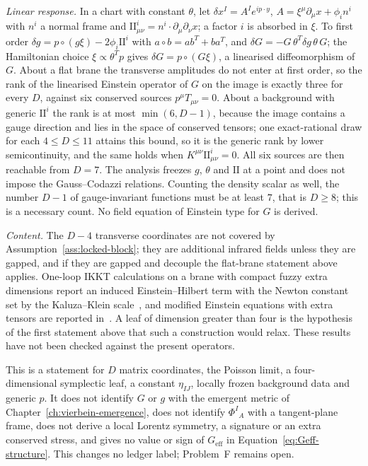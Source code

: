 \emph{Linear response.} In a chart with constant \(\theta\), let \(\delta x^{I}=A^{I}e^{ip\cdot y}\), \(A=\xi^{\mu}\partial_\mu x+\phi_i n^{i}\) with \(n^{i}\) a normal frame and \(\mathrm{II}^{i}_{\mu\nu}=n^{i}\cdot\partial_\mu\partial_\nu x\); a factor \(i\) is absorbed in \(\xi\). To first order \(\delta g=p\circ(g\xi)-2\phi_i\mathrm{II}^{i}\) with \(a\circ b=ab^{T}+ba^{T}\), and \(\delta G=-G\,\theta^{T}\delta g\,\theta\,G\); the Hamiltonian choice \(\xi\propto\theta^{T}p\) gives \(\delta G=p\circ(G\xi)\), a linearised diffeomorphism of \(G\). About a flat brane the transverse amplitudes do not enter at first order, so the rank of the linearised Einstein operator of \(G\) on the image is exactly three for every \(D\), against six conserved sources \(p^{\mu}T_{\mu\nu}=0\). About a background with generic \(\mathrm{II}^{i}\) the rank is at most \(\min(6,D-1)\), because the image contains a gauge direction and lies in the space of conserved tensors; one exact-rational draw for each \(4\le D\le11\) attains this bound, so it is the generic rank by lower semicontinuity, and the same holds when \(K^{\mu\nu}\mathrm{II}^{i}_{\mu\nu}=0\). All six sources are then reachable from \(D=7\). The analysis freezes \(g\), \(\theta\) and \(\mathrm{II}\) at a point and does not impose the Gauss--Codazzi relations. Counting the density scalar as well, the number \(D-1\) of gauge-invariant functions must be at least \(7\), that is \(D\ge8\); this is a necessary count. No field equation of Einstein type for \(G\) is derived.



\emph{Content.} The \(D-4\) transverse coordinates are not covered by Assumption~\ref{ass:locked-block}; they are additional infrared fields unless they are gapped, and if they are gapped and decouple the flat-brane statement above applies. One-loop IKKT calculations on a brane with compact fuzzy extra dimensions report an induced Einstein--Hilbert term with the Newton constant set by the Kaluza--Klein scale~\cite{Steinacker2023}, and modified Einstein equations with extra tensors are reported in~\cite{KumarSteinacker2023,Steinacker2026}. A leaf of dimension greater than four is the hypothesis of the first statement above that such a construction would relax. These results have not been checked against the present operators.



This is a statement for \(D\) matrix coordinates, the Poisson limit, a four-dimensional symplectic leaf, a constant \(\eta_{IJ}\), locally frozen background data and generic \(p\). It does not identify \(G\) or \(g\) with the emergent metric of Chapter~\ref{ch:vierbein-emergence}, does not identify \(\Phi^{I}{}_{A}\) with a tangent-plane frame, does not derive a local Lorentz symmetry, a signature or an extra conserved stress, and gives no value or sign of \(G_{\mathrm{eff}}\) in Equation~\eqref{eq:Geff-structure}. This changes no ledger label; Problem~F remains open.



